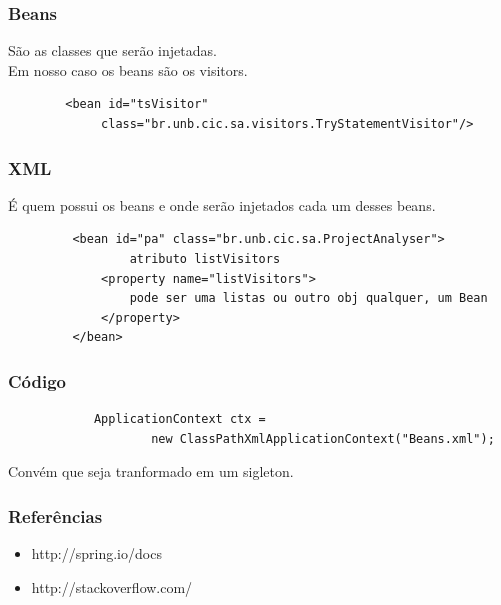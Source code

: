 \documentclass[10pt]{beamer}
\begin{document}
	\begin{frame}[fragile]\frametitle{Beans}
		\centering
		São as classes que serão injetadas.\\
		Em nosso caso os beans são os visitors.\\
		\lstset{language=XML}
		\begin{lstlisting}
		<bean id="tsVisitor" 
		     class="br.unb.cic.sa.visitors.TryStatementVisitor"/>
		\end{lstlisting}
	\end{frame}	
	
	
	\begin{frame}[fragile]\frametitle{XML}
		É quem possui os beans e onde serão injetados cada um desses beans.\\
		\lstset{language=XML}
		\begin{lstlisting}
		 <bean id="pa" class="br.unb.cic.sa.ProjectAnalyser">
			     atributo listVisitors
		     <property name="listVisitors">
		         pode ser uma listas ou outro obj qualquer, um Bean
		     </property>
		 </bean>
		\end{lstlisting}
	\end{frame}	
	
	
	\begin{frame}[fragile]\frametitle{Código}
		\centering
		\begin{verbatim}
			ApplicationContext ctx = 
			     	new ClassPathXmlApplicationContext("Beans.xml");
		\end{verbatim}
		Convém que seja tranformado em um sigleton.
		
	\end{frame}

	\begin{frame}\frametitle{Referências}
		\centering
		\begin{itemize}
			\item http://spring.io/docs
			\item http://stackoverflow.com/
		\end{itemize}
	\end{frame}
\end{document}
